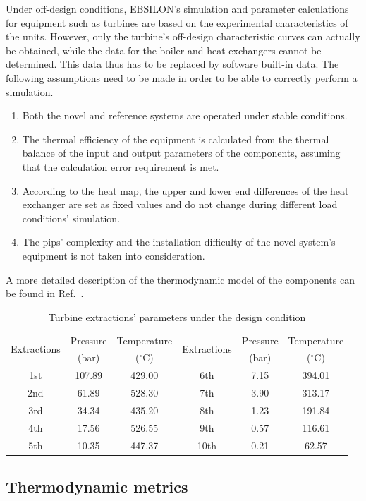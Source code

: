\documentclass[preprint,12pt]{elsarticle}
\begin{document}
Under off-design conditions, EBSILON's simulation and parameter calculations for equipment such as turbines are based on the experimental characteristics of the units.
However, only the turbine's off-design characteristic curves can actually be obtained, while the data for the boiler and heat exchangers cannot be determined.
This data thus has to be replaced by software built-in data.
The following assumptions need to be made in order to be able to correctly perform a simulation.
\begin{enumerate}[(1)]
\item Both the novel and reference systems are operated under stable conditions.
\item The thermal efficiency of the equipment is calculated from the thermal balance of the input and output parameters of the components, assuming that the calculation error requirement is met.
\item According to the heat map, the upper and lower end differences of the heat exchanger are set as fixed values and do not change during different load conditions' simulation.
\item The pips' complexity and the installation difficulty of the novel system's equipment is not taken into consideration.
\end{enumerate}
A more detailed description of the thermodynamic model of the components can be found in Ref.~\cite{Yao2017Multi}. 
\begin{table}
\caption{Turbine extractions' parameters under the design condition}
\label{table:extractions_parameter}
\begin{centering}
\begin{tabular}{cccccc}
\toprule 
\multirow{2}{*}{Extractions} & Pressure & Temperature & \multirow{2}{*}{Extractions} & Pressure & Temperature\tabularnewline
 & (bar) & ($^\circ$C) &  & (bar) & ($^\circ$C)\tabularnewline
\midrule
1st & 107.89  & 429.00 & 6th & 7.15  & 394.01 \tabularnewline
2nd & 61.89 & 528.30  & 7th & 3.90  & 313.17\tabularnewline
3rd & 34.34 & 435.20  & 8th & 1.23  & 191.84\tabularnewline
4th & 17.56  & 526.55  & 9th & 0.57  & 116.61\tabularnewline
5th & 10.35  & 447.37 & 10th & 0.21 & 62.57\tabularnewline
\bottomrule
\end{tabular}
\par\end{centering}
\end{table}

\subsection{Thermodynamic metrics} 
\label{ssub3:analsys method} 
\end{document}
